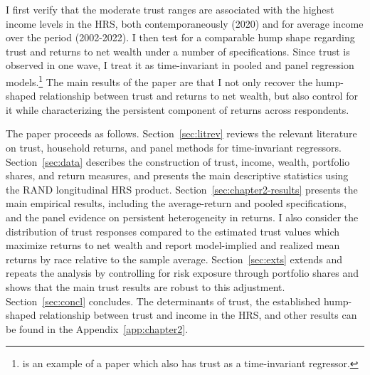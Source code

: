 \par I first verify that the moderate trust ranges are associated with the highest income levels in the HRS, both contemporaneously (2020) and for average income over the period (2002-2022). I then test for a comparable hump shape regarding trust and returns to net wealth under a number of specifications. Since trust is observed in one wave, I treat it as time-invariant in pooled and panel regression models.\footnote{\cite{Lesmeister2019} is an example of a paper which also has trust as a time-invariant regressor.} The main results of the paper are that I not only recover the hump-shaped relationship between trust and returns to net wealth, but also control for it while characterizing the persistent component of returns across respondents. 

\par The paper proceeds as follows. Section~\ref{sec:litrev} reviews the relevant literature on trust, household returns, and panel methods for time-invariant regressors. Section~\ref{sec:data} describes the construction of trust, income, wealth, portfolio shares, and return measures, and presents the main descriptive statistics using the RAND longitudinal HRS product. Section~\ref{sec:chapter2-results} presents the main empirical results, including the average-return and pooled specifications, and the panel evidence on persistent heterogeneity in returns. I also consider the distribution of trust responses compared to the estimated trust values which maximize returns to net wealth and report model-implied and realized mean returns by race relative to the sample average. Section~\ref{sec:exts} extends and repeats the analysis by controlling for risk exposure through portfolio shares and shows that the main trust results are robust to this adjustment. Section~\ref{sec:concl} concludes. The determinants of trust, the established hump-shaped relationship between trust and income in the HRS, and other results can be found in the Appendix~\ref{app:chapter2}.
